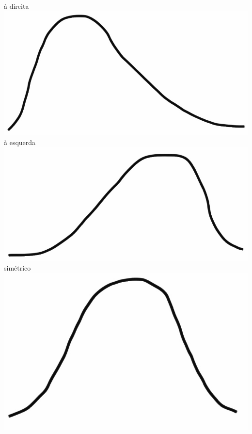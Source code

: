 \begin{frame}
\begin{itemize}
\begin{columns}[c]
à direita \\
\includegraphics[width=\textwidth]{1-6_numerical_data/figures/shape_sketches/right_skew.png} 
\pause
{}
à esquerda \\
\includegraphics[width=\textwidth]{1-6_numerical_data/figures/shape_sketches/left_skew.png} 
\pause
{}
simétrico \\
\includegraphics[width=\textwidth]{1-6_numerical_data/figures/shape_sketches/symmetric.png} 
\end{columns}

\end{itemize}

\end{frame}

